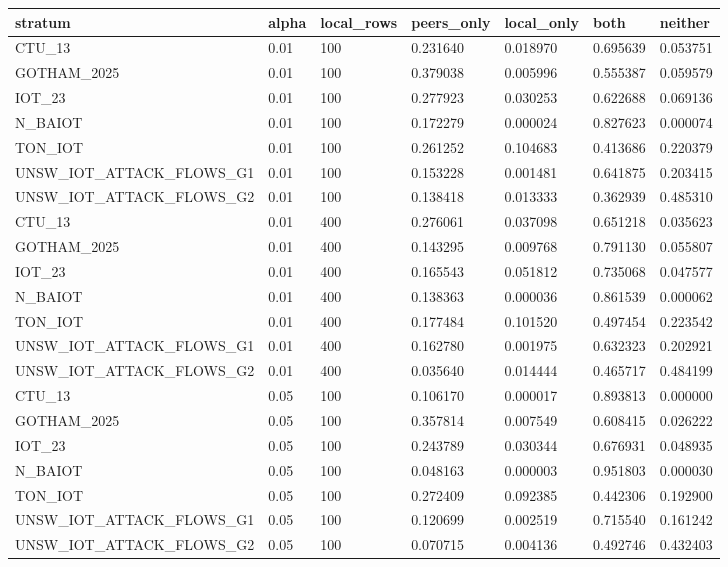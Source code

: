 \begin{tabular}{lllllll}
\toprule
stratum & alpha & local\_rows & peers\_only & local\_only & both & neither \\
\midrule
CTU\_13 & 0.01 & 100 & 0.231640 & 0.018970 & 0.695639 & 0.053751 \\
GOTHAM\_2025 & 0.01 & 100 & 0.379038 & 0.005996 & 0.555387 & 0.059579 \\
IOT\_23 & 0.01 & 100 & 0.277923 & 0.030253 & 0.622688 & 0.069136 \\
N\_BAIOT & 0.01 & 100 & 0.172279 & 0.000024 & 0.827623 & 0.000074 \\
TON\_IOT & 0.01 & 100 & 0.261252 & 0.104683 & 0.413686 & 0.220379 \\
UNSW\_IOT\_ATTACK\_FLOWS\_G1 & 0.01 & 100 & 0.153228 & 0.001481 & 0.641875 & 0.203415 \\
UNSW\_IOT\_ATTACK\_FLOWS\_G2 & 0.01 & 100 & 0.138418 & 0.013333 & 0.362939 & 0.485310 \\
CTU\_13 & 0.01 & 400 & 0.276061 & 0.037098 & 0.651218 & 0.035623 \\
GOTHAM\_2025 & 0.01 & 400 & 0.143295 & 0.009768 & 0.791130 & 0.055807 \\
IOT\_23 & 0.01 & 400 & 0.165543 & 0.051812 & 0.735068 & 0.047577 \\
N\_BAIOT & 0.01 & 400 & 0.138363 & 0.000036 & 0.861539 & 0.000062 \\
TON\_IOT & 0.01 & 400 & 0.177484 & 0.101520 & 0.497454 & 0.223542 \\
UNSW\_IOT\_ATTACK\_FLOWS\_G1 & 0.01 & 400 & 0.162780 & 0.001975 & 0.632323 & 0.202921 \\
UNSW\_IOT\_ATTACK\_FLOWS\_G2 & 0.01 & 400 & 0.035640 & 0.014444 & 0.465717 & 0.484199 \\
CTU\_13 & 0.05 & 100 & 0.106170 & 0.000017 & 0.893813 & 0.000000 \\
GOTHAM\_2025 & 0.05 & 100 & 0.357814 & 0.007549 & 0.608415 & 0.026222 \\
IOT\_23 & 0.05 & 100 & 0.243789 & 0.030344 & 0.676931 & 0.048935 \\
N\_BAIOT & 0.05 & 100 & 0.048163 & 0.000003 & 0.951803 & 0.000030 \\
TON\_IOT & 0.05 & 100 & 0.272409 & 0.092385 & 0.442306 & 0.192900 \\
UNSW\_IOT\_ATTACK\_FLOWS\_G1 & 0.05 & 100 & 0.120699 & 0.002519 & 0.715540 & 0.161242 \\
UNSW\_IOT\_ATTACK\_FLOWS\_G2 & 0.05 & 100 & 0.070715 & 0.004136 & 0.492746 & 0.432403 \\

\end{tabular}

